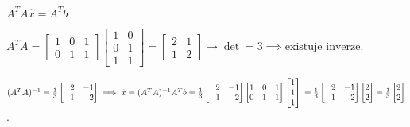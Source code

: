 $A^T A \hat x = A^T b$

$A^T A = 
\begin{bmatrix}
    1 & 0 & 1 \\
    0 & 1 & 1
\end{bmatrix}
\begin{bmatrix}
    1 & 0 \\
    0 & 1 \\
    1 & 1
\end{bmatrix}
=
\begin{bmatrix}
    2 & 1 \\
    1 & 2 
\end{bmatrix} 
\rightarrow \det = 3 \implies \text{existuje inverze.}$

$(A^T A)^{-1} = \frac{1}{3}
\begin{bmatrix}
    \phantom{-}2 & -1 \\
    -1 & \phantom{-}2 
\end{bmatrix} \implies \hat x = (A^T A)^{-1}A^T b = \frac{1}{3}
\begin{bmatrix}
    \phantom{-}2 & -1 \\
    -1 & \phantom{-}2 
\end{bmatrix}
\begin{bmatrix}
    1 & 0 & 1 \\
    0 & 1 & 1
\end{bmatrix}
\begin{bmatrix}
    1 \\
    1 \\
    1 
\end{bmatrix}\\ 
= \frac{1}{3}
\begin{bmatrix}
    \phantom{-}2 & -1 \\
    -1 & \phantom{-}2 
\end{bmatrix}
\begin{bmatrix}
    2 \\
    2 
\end{bmatrix} = \frac{1}{3}
\begin{bmatrix}
    2 \\
    2 
\end{bmatrix}$.

